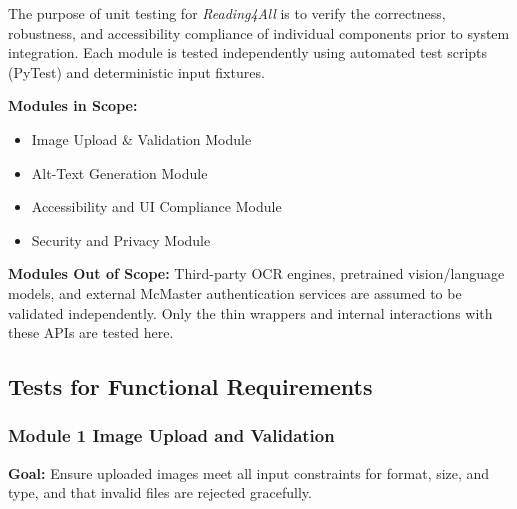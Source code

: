 \documentclass[12pt, titlepage]{article}
\begin{document}
The purpose of unit testing for \textit{Reading4All} is to verify the correctness, robustness, and accessibility compliance of individual components prior to system integration. Each module is tested independently using automated test scripts (PyTest) and deterministic input fixtures.

\textbf{Modules in Scope:}
\begin{itemize}
  \item Image Upload \& Validation Module
  \item Alt-Text Generation Module
  \item Accessibility and UI Compliance Module
  \item Security and Privacy Module
\end{itemize}

\textbf{Modules Out of Scope:}
Third-party OCR engines, pretrained vision/language models, and external McMaster authentication services are assumed to be validated independently. Only the thin wrappers and internal interactions with these APIs are tested here.

\subsection{Tests for Functional Requirements}

\subsubsection{Module 1 \textemdash{} Image Upload and Validation}

\textbf{Goal:} Ensure uploaded images meet all input constraints for format, size, and type, and that invalid files are rejected gracefully.
\end{document}
